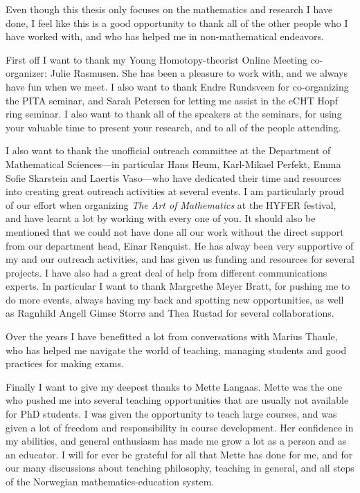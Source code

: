Even though this thesis only focuses on the mathematics and research I have done, I feel like this is a good opportunity to thank all of the other people who I have worked with, and who has helped me in non-mathematical endeavors. 

First off I want to thank my Young Homotopy-theorist Online Meeting co-organizer: Julie Rasmusen. She has been a pleasure to work with, and we always have fun when we meet. I also want to thank Endre Rundsveen for co-organizing the PITA seminar, and Sarah Petersen for letting me assist in the eCHT Hopf ring seminar. I also want to thank all of the speakers at the seminars, for using your valuable time to present your research, and to all of the people attending. 

I also want to thank the unofficial outreach committee at the Department of Mathematical Sciences---in particular Hans Heum, Karl-Mikael Perfekt, Emma Sofie Skarstein and Laertis Vaso---who have dedicated their time and resources into creating great outreach activities at several events. I am particularly proud of our effort when organizing \emph{The Art of Mathematics} at the HYFER festival, and have learnt a lot by working with every one of you. It should also be mentioned that we could not have done all our work without the direct support from our department head, Einar Rønquist. He has alway been very supportive of my and our outreach activities, and has given us funding and resources for several projects. I have also had a great deal of help from different communications experts. In particular I want to thank Margrethe Meyer Bratt, for pushing me to do more events, always having my back and spotting new opportunities, as well as Ragnhild Angell Gimse Storrø and Thea Rustad for several collaborations. 

Over the years I have benefitted a lot from conversations with Marius Thaule, who has helped me navigate the world of teaching, managing students and good practices for making exams. 

Finally I want to give my deepest thanks to Mette Langaas. Mette was the one who pushed me into several teaching opportunities that are usually not available for PhD students. I was given the opportunity to teach large courses, and was given a lot of freedom and responsibility in course development. Her confidence in my abilities, and general enthusiasm has made me grow a lot as a person and as an educator. I will for ever be grateful for all that Mette has done for me, and for our many discussions about teaching philosophy, teaching in general, and all steps of the Norwegian mathematics-education system.  

